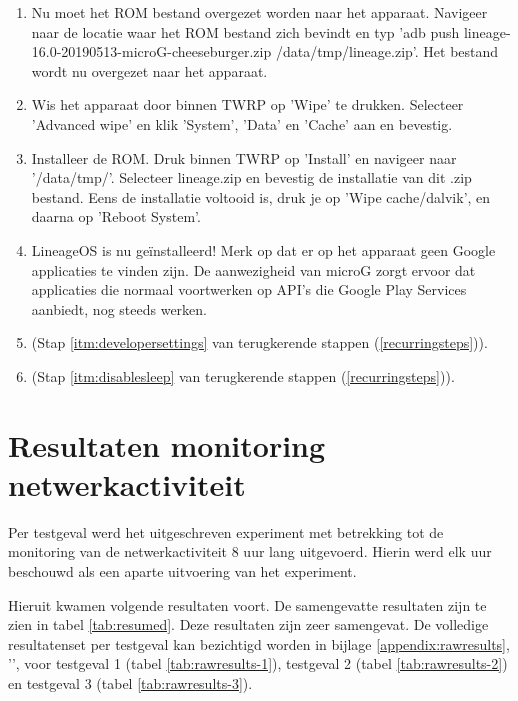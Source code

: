 \begin{enumerate}
    \item Nu moet het ROM bestand overgezet worden naar het apparaat. Navigeer naar de locatie waar het ROM bestand zich bevindt en typ 'adb push lineage-16.0-20190513-microG-cheeseburger.zip /data/tmp/lineage.zip'. Het bestand wordt nu overgezet naar het apparaat.
    
    \item Wis het apparaat door binnen TWRP op 'Wipe' te drukken. Selecteer 'Advanced wipe' en klik 'System', 'Data' en 'Cache' aan en bevestig.
    
    \item Installeer de ROM. Druk binnen TWRP op 'Install' en navigeer naar '/data/tmp/'. Selecteer lineage.zip en bevestig de installatie van dit .zip bestand. Eens de installatie voltooid is, druk je op 'Wipe cache/dalvik', en daarna op 'Reboot System'.
    
    \item 
    LineageOS is nu geïnstalleerd! Merk op dat er op het apparaat geen Google applicaties te vinden zijn. De aanwezigheid van microG zorgt ervoor dat applicaties die normaal voortwerken op API's die Google Play Services aanbiedt, nog steeds werken.
    
    \item 
     (Stap \ref{itm:developersettings} van terugkerende stappen (\ref{recurringsteps})).
    
    \item 
     (Stap \ref{itm:disablesleep} van terugkerende stappen (\ref{recurringsteps})).
\end{enumerate}

\section{Resultaten monitoring netwerkactiviteit}

Per testgeval werd het uitgeschreven experiment met betrekking tot de monitoring van de netwerkactiviteit 8 uur lang uitgevoerd. Hierin werd elk uur beschouwd als een aparte uitvoering van het experiment.

Hieruit kwamen volgende resultaten voort. De samengevatte resultaten zijn te zien in tabel \ref{tab:resumed}. Deze resultaten zijn zeer samengevat. De volledige resultatenset per testgeval kan bezichtigd worden in bijlage \ref{appendix:rawresults}, '', voor testgeval 1 (tabel \ref{tab:rawresults-1}), testgeval 2 (tabel \ref{tab:rawresults-2}) en testgeval 3 (tabel \ref{tab:rawresults-3}).

